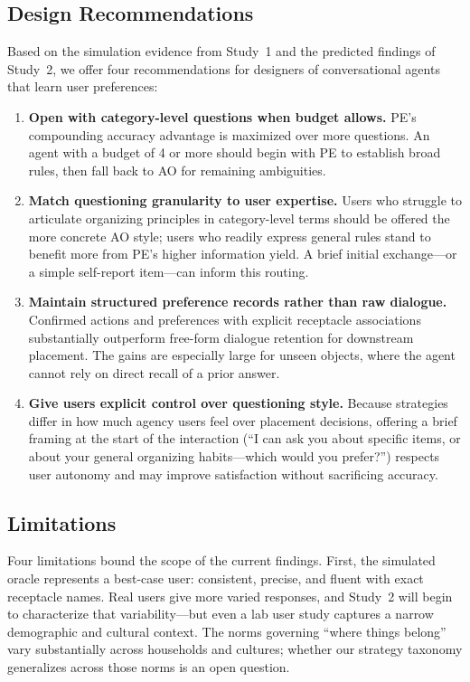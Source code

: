 \documentclass[a4paper,fleqn]{cas-sc}
\begin{document}
\subsection{Design Recommendations}

Based on the simulation evidence from Study~1 and the predicted findings of Study~2, we offer four recommendations for designers of conversational agents that learn user preferences:

\begin{enumerate}[leftmargin=*]
    \item \textbf{Open with category-level questions when budget allows.} PE's compounding accuracy advantage is maximized over more questions. An agent with a budget of 4 or more should begin with PE to establish broad rules, then fall back to AO for remaining ambiguities.
    \item \textbf{Match questioning granularity to user expertise.} Users who struggle to articulate organizing principles in category-level terms should be offered the more concrete AO style; users who readily express general rules stand to benefit more from PE's higher information yield. A brief initial exchange---or a simple self-report item---can inform this routing.
    \item \textbf{Maintain structured preference records rather than raw dialogue.} Confirmed actions and preferences with explicit receptacle associations substantially outperform free-form dialogue retention for downstream placement. The gains are especially large for unseen objects, where the agent cannot rely on direct recall of a prior answer.
    \item \textbf{Give users explicit control over questioning style.} Because strategies differ in how much agency users feel over placement decisions, offering a brief framing at the start of the interaction (``I can ask you about specific items, or about your general organizing habits---which would you prefer?'') respects user autonomy and may improve satisfaction without sacrificing accuracy.
\end{enumerate}

\subsection{Limitations}

Four limitations bound the scope of the current findings. First, the simulated oracle represents a best-case user: consistent, precise, and fluent with exact receptacle names. Real users give more varied responses, and Study~2 will begin to characterize that variability---but even a lab user study captures a narrow demographic and cultural context. The norms governing ``where things belong'' vary substantially across households and cultures; whether our strategy taxonomy generalizes across those norms is an open question.
\end{document}
